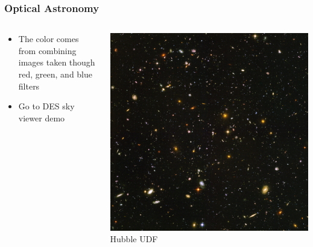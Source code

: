 \documentclass{beamer}
\begin{document}
\frame
{

    \frametitle{Optical Astronomy}


    \begin{columns}
        \begin{column}{0.5\textwidth}
            \begin{itemize}


                \item The color comes from combining images taken though red,
                    green, and blue filters

                \item Go to DES sky viewer demo

            \end{itemize}
        \end{column}
        \begin{column}{0.5\textwidth}
            \begin{center}
                \includegraphics[width=\textwidth]{UDF_half.jpg}
                \newline
                {\tiny Hubble UDF}
            \end{center}

            
        \end{column}
    \end{columns}


}
\end{document}
